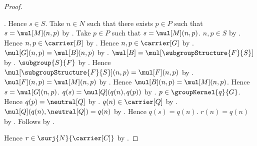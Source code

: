 \begin{proof}
\begin{subproof}
            .
        Hence $s\in S$.
        Take $n\in N$ such that there exists $p\in P$ such that
            $s=\mul[M](n,p)$ by .
        Take $p\in P$ such that $s=\mul[M](n,p)$.
        $n,p\in S$ by .
        Hence $n,p\in\carrier[B]$ by
            .
        Hence $n,p\in\carrier[G]$ by
            .
        $\mul[G](n,p)=\mul[B](n,p)$ by
            .
        $\mul[B]=\mul[\subgroupStructure{F}{S}]$ by
            .
        $\subgroup{S}{F}$ by .
        Hence $\mul[\subgroupStructure{F}{S}](n,p)=\mul[F](n,p)$ by
            .
        $\mul[F](n,p)=\mul[M](n,p)$ by
            .
        Hence $\mul[B](n,p)=\mul[M](n,p)$.
        Hence $s=\mul[G](n,p)$.
        $q(s)=\mul[Q](q(n),q(p))$ by .
        $p\in\groupKernel{q}{G}$.
        Hence $q(p)=\neutral[Q]$ by .
        $q(n)\in\carrier[Q]$ by .
        $\mul[Q](q(n),\neutral[Q])=q(n)$ by
            .
        Hence $q(s)=q(n)$.
        $r(n)=q(n)$ by .
        Follows by \auto.
    \end{subproof}
    Hence $r\in\surj{N}{\carrier[C]}$ by .
\end{proof}

